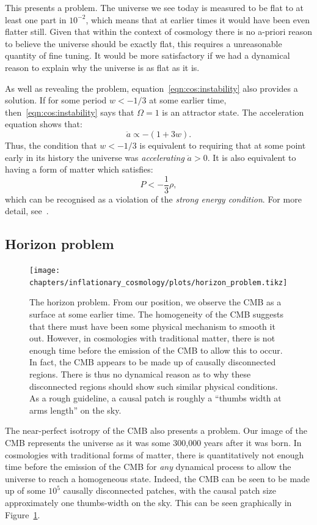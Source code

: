 This presents a problem. The universe we see today is measured to be flat to at least one part in \(10^{-2}\), which means that at earlier times it would have been even flatter still. Given that within the context of cosmology there is no a-priori reason to believe the universe should be exactly flat, this requires a unreasonable quantity of fine tuning. It would be more satisfactory if we had a dynamical reason to explain why the universe is as flat as it is.

As well as revealing the problem, equation~\eqref{eqn:cos:instability} also provides a solution. If for some period \(w<-1/3\) at some earlier time, then~\eqref{eqn:cos:instability} says that \(\Omega=1\) is an attractor state. The acceleration equation shows that:
\begin{equation}
  \ddot{a} \propto -(1+3w).
  \label{eqn:cos:Raychaudhuri_acc}
\end{equation}
Thus, the condition that \(w<-1/3\) is equivalent to requiring that at some point early in its history the universe was {\em accelerating\/} \(\ddot{a}>0\). It is also equivalent to having a form of matter which satisfies:
\begin{equation}
  P < -\frac{1}{3}\rho,
  \label{eqn:cos:SEC_violation}
\end{equation}
which can be recognised as a violation of the {\em strong energy condition}. For more detail, see~\cite{SEC_violation}.

\subsection{Horizon problem}
\begin{figure}[tp]
  \centering
  \texttt{[image: chapters/inflationary\_cosmology/plots/horizon\_problem.tikz]}
  \caption{The horizon problem. From our position, we observe the CMB as a surface at some earlier time. The homogeneity of the CMB suggests that there must have been some physical mechanism to smooth it out. However, in cosmologies with traditional matter, there is not enough time before the emission of the CMB to allow this to occur. In fact, the CMB appears to be made up of causally disconnected regions. There is thus no dynamical reason as to why these disconnected regions should show such similar physical conditions. As a rough guideline, a causal patch is roughly a ``thumbs width at arms length'' on the sky.}\label{fig:cos:horizon_problem}
\end{figure}
The near-perfect isotropy of the CMB also presents a problem. Our image of the CMB represents the universe as it was some 300,000 years after it was born. In cosmologies with traditional forms of matter, there is quantitatively not enough time before the emission of the CMB for {\em any\/} dynamical process to allow the universe to reach a homogeneous state. Indeed, the CMB can be seen to be made up of some \(10^{5}\) causally disconnected patches, with the causal patch size approximately one thumbs-width on the sky. This can be seen graphically in Figure~\ref{fig:cos:horizon_problem}.

